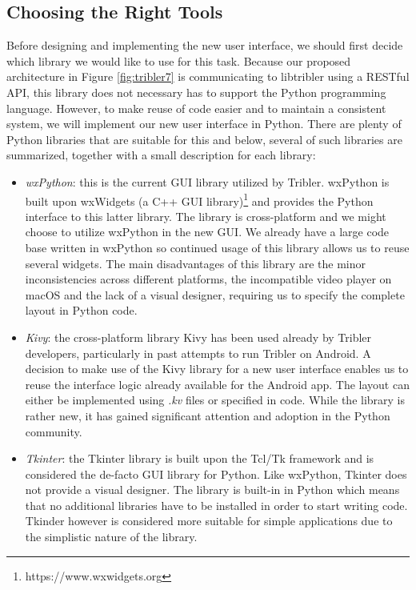 \subsection{Choosing the Right Tools}
Before designing and implementing the new user interface, we should first decide which library we would like to use for this task. Because our proposed architecture in Figure \ref{fig:tribler7} is communicating to libtribler using a RESTful API, this library does not necessary has to support the Python programming language. However, to make reuse of code easier and to maintain a consistent system, we will implement our new user interface in Python. There are plenty of Python libraries that are suitable for this and below, several of such libraries are summarized, together with a small description for each library:
\begin{itemize}
	\item \emph{wxPython}\cite{rappin2006wxpython}: this is the current GUI library utilized by Tribler. wxPython is built upon wxWidgets (a C++ GUI library)\footnote{https://www.wxwidgets.org} and provides the Python interface to this latter library. The library is cross-platform and we might choose to utilize wxPython in the new GUI. We already have a large code base written in wxPython so continued usage of this library allows us to reuse several widgets. The main disadvantages of this library are the minor inconsistencies across different platforms, the incompatible video player on macOS and the lack of a visual designer, requiring us to specify the complete layout in Python code.
	\item \emph{Kivy}\cite{solis2015kivy}: the cross-platform library Kivy has been used already by Tribler developers, particularly in past attempts to run Tribler on Android\cite{de2014android}\cite{sabee2014tribler}. A decision to make use of the Kivy library for a new user interface enables us to reuse the interface logic already available for the Android app. The layout can either be implemented using \emph{.kv} files or specified in code. While the library is rather new, it has gained significant attention and adoption in the Python community.
	\item \emph{Tkinter}\cite{lundh1999introduction}: the Tkinter library is built upon the Tcl/Tk framework and is considered the de-facto GUI library for Python. Like wxPython, Tkinter does not provide a visual designer. The library is built-in in Python which means that no additional libraries have to be installed in order to start writing code. Tkinder however is considered more suitable for simple applications due to the simplistic nature of the library.

\end{itemize}
